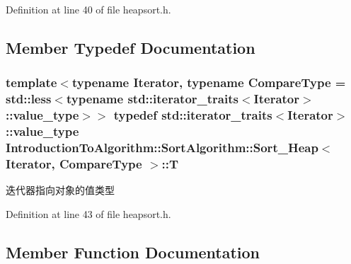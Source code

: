 Definition at line 40 of file heapsort.\+h.



\subsection{Member Typedef Documentation}
\hypertarget{class_introduction_to_algorithm_1_1_sort_algorithm_1_1_sort___heap_a5af910656f5d3c65d47f992dbf380c61}{}
\subsubsection[{T}]{\setlength{\rightskip}{0pt plus 5cm}template$<$typename Iterator, typename Compare\+Type = std\+::less$<$typename std\+::iterator\+\_\+traits$<$\+Iterator$>$\+::value\+\_\+type$>$$>$ typedef std\+::iterator\+\_\+traits$<$Iterator$>$\+::value\+\_\+type {\bf Introduction\+To\+Algorithm\+::\+Sort\+Algorithm\+::\+Sort\+\_\+\+Heap}$<$ Iterator, Compare\+Type $>$\+::{\bf T}}\label{class_introduction_to_algorithm_1_1_sort_algorithm_1_1_sort___heap_a5af910656f5d3c65d47f992dbf380c61}
迭代器指向对象的值类型 

Definition at line 43 of file heapsort.\+h.



\subsection{Member Function Documentation}
\hypertarget{class_introduction_to_algorithm_1_1_sort_algorithm_1_1_sort___heap_a0535910130c6c750faf7801059e4a9fa}{}
